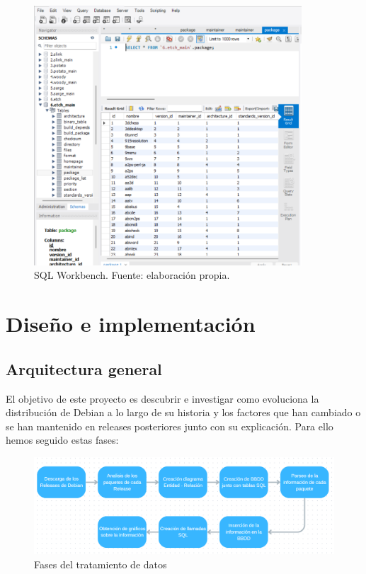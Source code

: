 \documentclass[a4paper, 12pt]{book}
\begin{document}
\begin{figure}[hb]
	\centering
	\includegraphics[width=10cm, keepaspectratio]{img/workbench.png}
	\caption{SQL Workbench. Fuente: elaboración propia.}
	\label{fig:workbench}
\end{figure}

\cleardoublepage
\chapter{Diseño e implementación}
\label{sec:diseno}

\section{Arquitectura general} 
\label{sec:arquitectura}
El objetivo de este proyecto es descubrir e investigar como evoluciona la distribución de Debian a lo largo de su historia y los factores que han cambiado o se han mantenido en releases posteriores junto con su explicación. Para ello hemos seguido estas fases:
\begin{figure}[h]
	\centering
	\includegraphics[width=14cm, keepaspectratio]{img/Diagrama_general.png}
	\caption{Fases del tratamiento de datos}
	\label{fig:Diagrama_general}
\end{figure}
\end{document}
